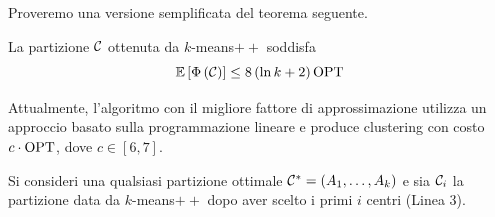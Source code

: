 Proveremo una versione semplificata del teorema seguente.\\

\begin{theorem}
    La partizione $\mathcal{C}$ ottenuta da $k$-means$++$ soddisfa
    $$\mathbb{E} \left[\Phi\left(\mathcal{C}\right)\right] \leq 8 \left(\ln k + 2\right) \textnormal{OPT}$$
\end{theorem}

Attualmente, l'algoritmo con il migliore fattore di approssimazione utilizza un approccio basato sulla programmazione lineare e produce clustering con costo $c \cdot \textnormal{OPT}$, dove $c \in [6,7]$.

Si consideri una qualsiasi partizione ottimale $\mathcal{C}^\ast = \left(A_1, \dots, A_k\right)$ e sia $\mathcal{C}_i$ la partizione data da $k$-means$++$ dopo aver scelto i primi $i$ centri (Linea 3).\\

